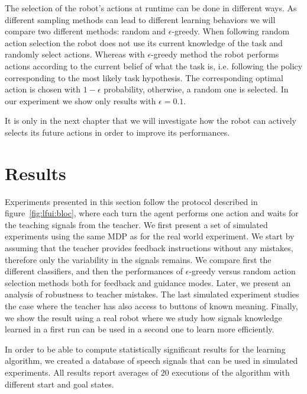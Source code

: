 The selection of the robot's actions at runtime can be done in different ways. As different sampling methods can lead to different learning behaviors we will compare two different methods: random and  $\epsilon$-greedy. When following random action selection the robot does not use its current knowledge of the task and randomly select actions. Whereas with $\epsilon$-greedy method the robot performs actions according to the current belief of what the task is, i.e. following the policy corresponding to the most likely task hypothesis. The corresponding optimal action is chosen with $1-\epsilon$ probability, otherwise, a random one is selected. In our experiment we show only results with $\epsilon =  0.1$.

It is only in the next chapter that we will investigate how the robot can actively selects its future actions in order to improve its performances.

\section{Results}
\label{chapter:lfui:results}

Experiments presented in this section follow the protocol described in figure~\ref{fig:lfui:bloc}, where each turn the agent performs one action and waits for the teaching signals from the teacher. We first present a set of simulated experiments using the same MDP as for the real world experiment. We start by assuming that the teacher provides feedback instructions without any mistakes, therefore only the variability in the signals remains. We compare first the different classifiers, and then the performances of $\epsilon$-greedy versus random action selection methods both for feedback and guidance modes. Later, we present an analysis of robustness to teacher mistakes. The last simulated experiment studies the case where the teacher has also access to buttons of known meaning. Finally, we show the result using a real robot where we study how signals knowledge learned in a first run can be used in a second one to learn more efficiently.

In order to be able to compute statistically significant results for the learning algorithm, we created a database of speech signals that can be used in simulated experiments. All results report averages of $20$ executions of the algorithm with different start and goal states. 

